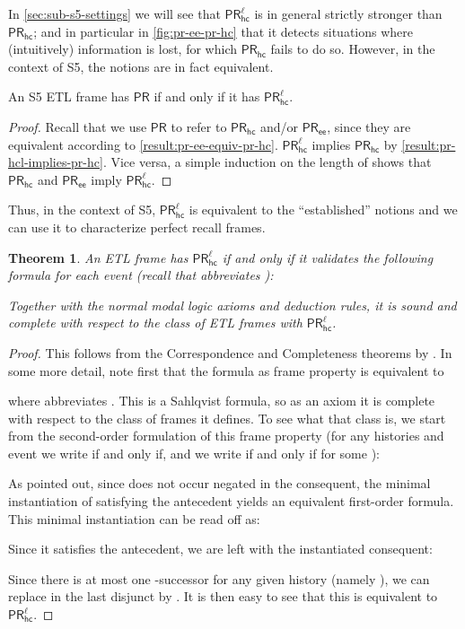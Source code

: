\documentclass{article}
\newcommand{\PR}{\ensuremath{\mathsf{PR}}\xspace}
\newcommand{\PRhc}{\ensuremath{\mathsf{PR_{hc}}}\xspace}
\newcommand{\PRhcl}{\ensuremath{\mathsf{PR_{hc}^\ell}}\xspace}
\newcommand{\PRee}{\ensuremath{\mathsf{PR_{ee}}}\xspace}
\newcommand{\tiff}{if and only if\xspace}
\newcounter{#1}
\newtheorem{theorem}{Theorem}[section]
\begin{document}
In \cref{sec:sub-s5-settings} we will see that \PRhcl is in general strictly stronger than \PRhc;
and in particular in \cref{fig:pr-ee-pr-hc} that it detects situations where (intuitively) information is lost,
for which \PRhc fails to do so.
However, in the context of S5, the notions are in fact equivalent.

\begin{proposition}
  \label{result:pr-ee-equiv-pr-hc-equiv-pr-hcl}
  An S5 ETL frame has \PR \tiff it has \PRhcl.
\end{proposition}
\begin{proof}
  Recall that we use \PR to refer to \PRhc and/or \PRee,
  since they are equivalent according to \cref{result:pr-ee-equiv-pr-hc}.
  \PRhcl implies \PRhc by \cref{result:pr-hcl-implies-pr-hc}.
  Vice versa, a simple induction on the length of  shows that \PRhc and \PRee imply \PRhcl.
\end{proof}

Thus, in the context of S5, \PRhcl is equivalent to the ``established'' notions and
we can use it to characterize perfect recall frames.

\begin{theorem}
\label{result:pr-hcl-definable}
  An ETL frame has \PRhcl \tiff it validates the following formula for each event 
  (recall that  abbreviates ):
  
  Together with the normal modal logic axioms and deduction rules,
  it is sound and complete with respect to the class of ETL frames with \PRhcl.
\end{theorem}
\begin{proof}
  This follows from the Correspondence and Completeness theorems by \citet{sahlqvist_completeness_1975}.
  In some more detail, note first that the formula as frame property is equivalent to
  
  where  abbreviates .
  This is a Sahlqvist formula, so as an axiom it is complete
  with respect to the class of frames it defines.
  To see what that class is, we start from the second-order formulation of this frame property
  (for any histories  and event  we write  \tiff ,
  and we write  \tiff  for some ):
  
  As \citeauthor{sahlqvist_completeness_1975} pointed out,
  since  does not occur negated in the consequent,
  the minimal instantiation of  satisfying the antecedent
  yields an equivalent first-order formula.
  This minimal instantiation can be read off as:
  
  Since it satisfies the antecedent,
  we are left with the instantiated consequent:
  
  Since there is at most one -successor for any given history  (namely ),
  we can replace  in the last disjunct by .
  It is then easy to see that this is equivalent to \PRhcl.
\end{proof}
\end{document}
